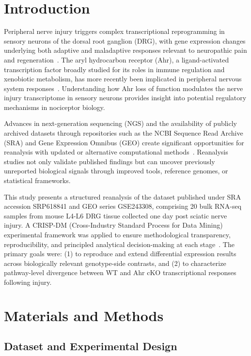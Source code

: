 \documentclass[conference]{IEEEtran}
\begin{document}
\section{Introduction}

Peripheral nerve injury triggers complex transcriptional reprogramming in sensory neurons of the dorsal root ganglion (DRG), with gene expression changes underlying both adaptive and maladaptive responses relevant to neuropathic pain and regeneration~\cite{usoskin2015}. The aryl hydrocarbon receptor (Ahr), a ligand-activated transcription factor broadly studied for its roles in immune regulation and xenobiotic metabolism, has more recently been implicated in peripheral nervous system responses~\cite{quintana2008}. Understanding how Ahr loss of function modulates the nerve injury transcriptome in sensory neurons provides insight into potential regulatory mechanisms in nociceptor biology.

Advances in next-generation sequencing (NGS) and the availability of publicly archived datasets through repositories such as the NCBI Sequence Read Archive (SRA) and Gene Expression Omnibus (GEO) create significant opportunities for reanalysis with updated or alternative computational methods~\cite{edgar2002}. Reanalysis studies not only validate published findings but can uncover previously unreported biological signals through improved tools, reference genomes, or statistical frameworks.

This study presents a structured reanalysis of the dataset published under SRA accession SRP618841 and GEO series GSE243308, comprising 20 bulk RNA-seq samples from mouse L4-L6 DRG tissue collected one day post sciatic nerve injury. A CRISP-DM (Cross-Industry Standard Process for Data Mining) experimental framework was applied to ensure methodological transparency, reproducibility, and principled analytical decision-making at each stage~\cite{wirth2000}. The primary goals were: (1) to reproduce and extend differential expression results across biologically relevant genotype-side contrasts, and (2) to characterize pathway-level divergence between WT and Ahr cKO transcriptional responses following injury.

\section{Materials and Methods}

\subsection{Dataset and Experimental Design}
\end{document}
